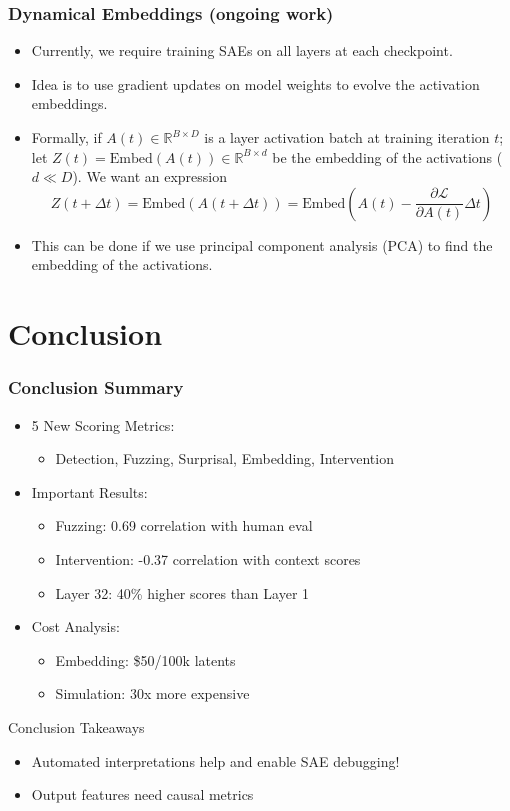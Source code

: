 \documentclass{beamer}
\begin{document}
\begin{frame}
\frametitle{Dynamical Embeddings (ongoing work)}
\begin{itemize}
    \item Currently, we require training SAEs on all layers at each checkpoint.
    \item Idea is to use gradient updates on model weights to evolve the activation embeddings.
    \item Formally, if $A(t) \in \mathbb{R}^{B \times D}$ is a layer activation batch at training iteration $t$; let $Z(t) = \mathrm{Embed}(A(t)) \in \mathbb{R}^{B \times d}$ be the embedding of the activations ($d \ll D$). We want an expression \[
    Z(t + \Delta t) = \mathrm{Embed}(A(t + \Delta t)) = \mathrm{Embed}\left(A(t) - \frac{\partial \mathcal L}{\partial A(t)} \Delta t\right)
    \]
    \item This can be done if we use principal component analysis (PCA) to find the embedding of the activations.
\end{itemize}
\end{frame}


\section{Conclusion}
\begin{frame}
\frametitle{Conclusion Summary}
\begin{itemize}
    \item 5 New Scoring Metrics:
    \begin{itemize}
        \item Detection, Fuzzing, Surprisal, Embedding, Intervention
    \end{itemize}
    
    \item Important Results:
    \begin{itemize}
        \item Fuzzing: 0.69 correlation with human eval
        \item Intervention: -0.37 correlation with context scores
        \item Layer 32: 40\% higher scores than Layer 1
    \end{itemize}
    
    \item Cost Analysis:
    \begin{itemize}
        \item Embedding: \$50/100k latents
        \item Simulation: 30x more expensive
    \end{itemize}
\end{itemize}

\begin{alertblock}
{Conclusion Takeaways}
\begin{itemize}
    \item Automated interpretations help and enable SAE debugging!
    \item Output features need causal metrics
\end{itemize}
\end{alertblock}
\end{frame}
\end{document}

